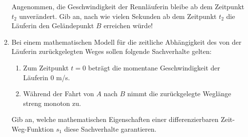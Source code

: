 \begin{langesbeispiel}
\begin{enumerate}
	Angenommen, die Geschwindigkeit der Rennläuferin bleibe ab dem Zeitpunkt $t_2$ unverändert. Gib an, nach wie vielen Sekunden ab dem Zeitpunkt $t_2$ die Läuferin den Geländepunkt $B$ erreichen würde!
	
	\item Bei einem mathematischen Modell für die zeitliche Abhängigkeit des von der Läuferin zurückgelegten Weges sollen folgende Sachverhalte gelten:
	
	\begin{enumerate}
		\item Zum Zeitpunkt $t=0$ beträgt die momentane Geschwindigkeit der Läuferin 0 m/s.
		\item Während der Fahrt von $A$ nach $B$ nimmt die zurückgelegte Weglänge streng monoton zu.
	\end{enumerate}
	
	Gib an, welche mathematischen Eigenschaften einer differenzierbaren Zeit-Weg-Funktion $s_1$ diese Sachverhalte garantieren.
						\end{enumerate}\leer
				
\end{langesbeispiel}
